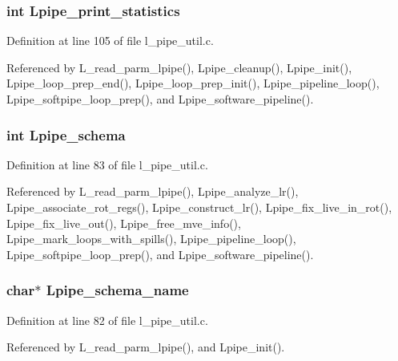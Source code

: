 \subsubsection{\setlength{\rightskip}{0pt plus 5cm}int \bf{Lpipe\_\-print\_\-statistics}}\label{l__pipe__util_8h_ab2140575cdf9b3526e6da5ea095a784}




Definition at line 105 of file l\_\-pipe\_\-util.c.

Referenced by L\_\-read\_\-parm\_\-lpipe(), Lpipe\_\-cleanup(), Lpipe\_\-init(), Lpipe\_\-loop\_\-prep\_\-end(), Lpipe\_\-loop\_\-prep\_\-init(), Lpipe\_\-pipeline\_\-loop(), Lpipe\_\-softpipe\_\-loop\_\-prep(), and Lpipe\_\-software\_\-pipeline().
\subsubsection{\setlength{\rightskip}{0pt plus 5cm}int \bf{Lpipe\_\-schema}}\label{l__pipe__util_8h_9929661b757af9845e6325f4752a7d87}




Definition at line 83 of file l\_\-pipe\_\-util.c.

Referenced by L\_\-read\_\-parm\_\-lpipe(), Lpipe\_\-analyze\_\-lr(), Lpipe\_\-associate\_\-rot\_\-regs(), Lpipe\_\-construct\_\-lr(), Lpipe\_\-fix\_\-live\_\-in\_\-rot(), Lpipe\_\-fix\_\-live\_\-out(), Lpipe\_\-free\_\-mve\_\-info(), Lpipe\_\-mark\_\-loops\_\-with\_\-spills(), Lpipe\_\-pipeline\_\-loop(), Lpipe\_\-softpipe\_\-loop\_\-prep(), and Lpipe\_\-software\_\-pipeline().
\subsubsection{\setlength{\rightskip}{0pt plus 5cm}char$\ast$ \bf{Lpipe\_\-schema\_\-name}}\label{l__pipe__util_8h_659205866ba47e73cc85c2376ecd1985}




Definition at line 82 of file l\_\-pipe\_\-util.c.

Referenced by L\_\-read\_\-parm\_\-lpipe(), and Lpipe\_\-init().
